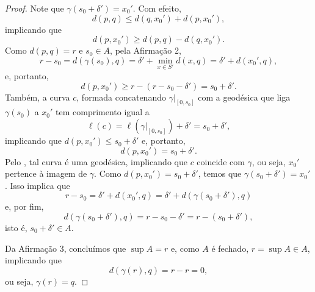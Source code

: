 \begin{lemma}
\begin{proof}
        Note que $\gamma(s_0 + \delta') = x_0'$. Com efeito,
        \begin{equation*}
            d(p,q) \leq d(q, x_0') + d(p, x_0'),
        \end{equation*}
        implicando que
        \begin{equation*}
            d(p, x_0') \geq d(p,q) - d(q, x_0').
        \end{equation*}
        Como $d(p,q) = r$ e $s_{0} \in A$, pela Afirmação 2,
        \begin{equation*}
            r - s_0 = d(\gamma(s_0), q) = \delta' + \min_{x \in S'} d(x,q) = \delta' + d(x_0', q),
        \end{equation*}
        e, portanto,
        \begin{equation*}
            d(p, x_0') \geq r - (r - s_0 - \delta') = s_0 + \delta'.
        \end{equation*}
        Também, a curva $c$, formada concatenando $\gamma|_{[0,s_0]}$ com a geodésica que liga $\gamma(s_0)$ a $x_0'$ tem comprimento igual a
        \begin{equation*}
            \ell(c) = \ell(\gamma|_{[0,s_0]}) + \delta' = s_0 + \delta',
        \end{equation*}
        implicando que $d(p, x_0') \leq s_0 + \delta'$ e, portanto,
        \begin{equation*}
            d(p, x_0') = s_0 + \delta'.
        \end{equation*}
        Pelo , tal curva é uma geodésica, implicando que $c$ coincide com $\gamma$, ou seja, $x_0'$ pertence à imagem de $\gamma$. Como $d(p, x_0') = s_0 + \delta'$, temos que $\gamma(s_0 + \delta') = x_0'$.
        Isso implica que
        \begin{equation*}
            r - s_0 = \delta' + d(x_0', q) = \delta' + d(\gamma(s_0 + \delta'), q)
        \end{equation*}
        e, por fim,
        \begin{equation*}
            d(\gamma(s_0 + \delta'), q) = r - s_0 - \delta' = r - (s_0 + \delta'),
        \end{equation*}
        isto é, $s_0 + \delta' \in A$.

        Da Afirmação 3, concluímos que $\sup A = r$ e, como $A$ é fechado, $r = \sup A \in A$, implicando que
        \begin{equation*}
            d(\gamma(r), q) = r - r = 0,
        \end{equation*}
        ou seja, $\gamma(r) = q$.
    \end{proof}
\end{lemma}


